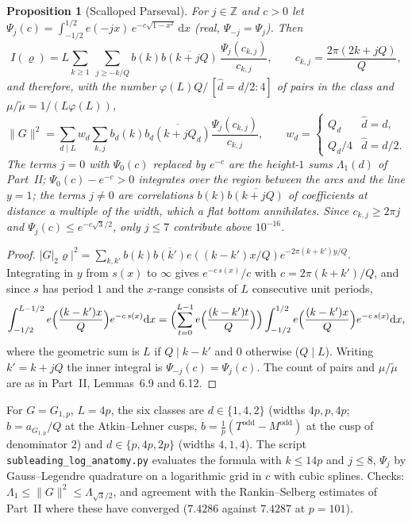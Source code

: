 \documentclass[11pt]{amsart}
\newtheorem{proposition}[theorem]{Proposition}
\theoremstyle{remark}
\newcommand{\Z}{\mathbb{Z}}
\newcommand{\dd}{\mathrm{d}}
\begin{document}
\begin{proposition}[Scalloped Parseval]\label{prop:scallop}
For $j\in\Z$ and $c>0$ let $\Psi_j(c)=\int_{-1/2}^{1/2}e(-jx)\,e^{-c\sqrt{1-x^2}}\,\dd x$ (real, $\Psi_{-j}=\Psi_j$). Then
\[
I(\varrho)=L\sum_{k\ge1}\ \sum_{j\ge-k/Q}b(k)\overline{b(k+jQ)}\,\frac{\Psi_j(c_{k,j})}{c_{k,j}},\qquad c_{k,j}=\frac{2\pi(2k+jQ)}{Q},
\]
and therefore, with the number $\varphi(L)Q/\,[\hat d=d/2\colon4]$ of pairs in the class and $\mu/\tilde\mu=1/(L\varphi(L))$,
\[
\|G\|^2=\sum_{d\mid L}w_d\sum_{k,j}b_d(k)\overline{b_d(k+jQ_d)}\frac{\Psi_j(c_{k,j})}{c_{k,j}},\qquad w_d=\begin{cases}Q_d&\hat d=d,\\ Q_d/4&\hat d=d/2.\end{cases}
\]
The terms $j=0$ with $\Psi_0(c)$ replaced by $e^{-c}$ are the height-$1$ sums $\Lambda_1(d)$ of Part~II; $\Psi_0(c)-e^{-c}>0$ integrates over the region between the arcs and the line $y=1$; the terms $j\ne0$ are correlations $b(k)\overline{b(k+jQ)}$ of coefficients at distance a multiple of the width, which a flat bottom annihilates. Since $c_{k,j}\ge2\pi j$ and $\Psi_j(c)\le e^{-c\sqrt3/2}$, only $j\le7$ contribute above $10^{-16}$.
\end{proposition}
\begin{proof}
$|G|_2\varrho|^2=\sum_{k,k'}b(k)\overline{b(k')}e((k-k')x/Q)e^{-2\pi(k+k')y/Q}$. Integrating in $y$ from $s(x)$ to $\infty$ gives $e^{-c\,s(x)}/c$ with $c=2\pi(k+k')/Q$, and since $s$ has period $1$ and the $x$-range consists of $L$ consecutive unit periods,
\[
\int_{-1/2}^{L-1/2}e\Bigl(\frac{(k-k')x}Q\Bigr)e^{-c\,s(x)}\dd x=\Bigl(\sum_{t=0}^{L-1}e\Bigl(\frac{(k-k')t}Q\Bigr)\Bigr)\int_{-1/2}^{1/2}e\Bigl(\frac{(k-k')x}Q\Bigr)e^{-c\,s(x)}\dd x,
\]
where the geometric sum is $L$ if $Q\mid k-k'$ and $0$ otherwise ($Q\mid L$). Writing $k'=k+jQ$ the inner integral is $\Psi_{-j}(c)=\Psi_j(c)$. The count of pairs and $\mu/\tilde\mu$ are as in Part~II, Lemmas~6.9 and 6.12.
\end{proof}

For $G=G_{1,p}$, $L=4p$, the six classes are $d\in\{1,4,2\}$ (widths $4p,p,4p$; $b=a_{G_{1,p}}/Q$ at the Atkin--Lehner cusps, $b=\frac1p(T^{\mathrm{odd}}-M^{\mathrm{odd}})$ at the cusp of denominator $2$) and $d\in\{p,4p,2p\}$ (widths $4,1,4$). The script \texttt{subleading\_log\_anatomy.py} evaluates the formula with $k\le14p$ and $j\le8$, $\Psi_j$ by Gauss--Legendre quadrature on a logarithmic grid in $c$ with cubic splines. Checks: $\Lambda_1\le\|G\|^2\le\Lambda_{\sqrt3/2}$, and agreement with the Rankin--Selberg estimates of Part~II where these have converged ($7.4286$ against $7.4287$ at $p=101$).
\end{document}
